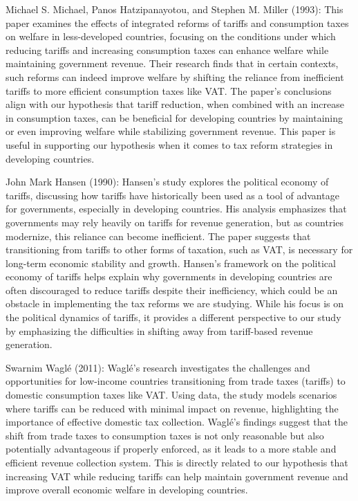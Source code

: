 \documentclass[12pt]{article}
\begin{document}
Michael S. Michael, Panos Hatzipanayotou, and Stephen M. Miller (1993):
This paper examines the effects of integrated reforms of tariffs and consumption taxes on welfare in less-developed countries, focusing on the conditions under which reducing tariffs and increasing consumption taxes can enhance welfare while maintaining government revenue. Their research finds that in certain contexts, such reforms can indeed improve welfare by shifting the reliance from inefficient tariffs to more efficient consumption taxes like VAT. The paper’s conclusions align with our hypothesis that tariff reduction, when combined with an increase in consumption taxes, can be beneficial for developing countries by maintaining or even improving welfare while stabilizing government revenue. This paper is useful in supporting our hypothesis when it comes to tax reform strategies in developing countries.

John Mark Hansen (1990):
Hansen's study explores the political economy of tariffs, discussing how tariffs have historically been used as a tool of advantage for governments, especially in developing countries. His analysis emphasizes that governments may rely heavily on tariffs for revenue generation, but as countries modernize, this reliance can become inefficient. The paper suggests that transitioning from tariffs to other forms of taxation, such as VAT, is necessary for long-term economic stability and growth. Hansen’s framework on the political economy of tariffs helps explain why governments in developing countries are often discouraged to reduce tariffs despite their inefficiency, which could be an obstacle in implementing the tax reforms we are studying. While his focus is on the political dynamics of tariffs, it provides a different perspective to our study by emphasizing the difficulties in shifting away from tariff-based revenue generation.

Swarnim Waglé (2011):
Waglé's research investigates the challenges and opportunities for low-income countries transitioning from trade taxes (tariffs) to domestic consumption taxes like VAT. Using data, the study models scenarios where tariffs can be reduced with minimal impact on revenue, highlighting the importance of effective domestic tax collection. Waglé’s findings suggest that the shift from trade taxes to consumption taxes is not only reasonable but also potentially advantageous if properly enforced, as it leads to a more stable and efficient revenue collection system. This is directly related to our hypothesis that increasing VAT while reducing tariffs can help maintain government revenue and improve overall economic welfare in developing countries.
\end{document}
